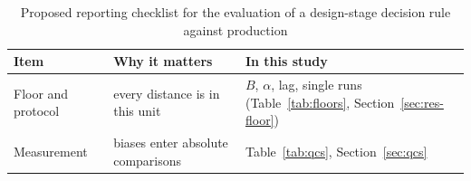 \documentclass[pdflatex,sn-basic,lineno]{sn-jnl}
\newcommand{\tabsize}{\fontsize{8}{9.5}\selectfont}
\providecommand{\DIFaddbeginFL}{} %
\providecommand{\DIFdelbeginFL}{} %
\providecommand{\DIFdelendFL}{} %
\newcommand{\DIFscaledelfig}{0.5}
\newlength{\DIFdelgraphicswidth} %
\newlength{\DIFdelgraphicsheight} %
\newcommand{\DIFaddincludegraphics}[2][]{{\color{blue}\fbox{\DIFOincludegraphics[#1]{#2}}}} %
\newcommand{\DIFdelincludegraphics}[2][]{%
\sbox{\DIFdelgraphicsbox}{\DIFOincludegraphics[#1]{#2}}%
\settoboxwidth{\DIFdelgraphicswidth}{\DIFdelgraphicsbox} %
\settoboxtotalheight{\DIFdelgraphicsheight}{\DIFdelgraphicsbox} %
\scalebox{\DIFscaledelfig}{%
\parbox[b]{\DIFdelgraphicswidth}{\usebox{\DIFdelgraphicsbox}\\[-\baselineskip] \rule{\DIFdelgraphicswidth}{0em}}\llap{\resizebox{\DIFdelgraphicswidth}{\DIFdelgraphicsheight}{%
\setlength{\unitlength}{\DIFdelgraphicswidth}%
\begin{picture}(1,1)%
\thicklines\linethickness{2pt} %
{\color[rgb]{1,0,0}\put(0,0){\framebox(1,1){}}}%
{\color[rgb]{1,0,0}\put(0,0){\line( 1,1){1}}}%
{\color[rgb]{1,0,0}\put(0,1){\line(1,-1){1}}}%
\end{picture}%
}\hspace*{3pt}}} %
} %
\DeclareRobustCommand{\DIFaddbeginFL}{\DIFOaddbeginFL \let\includegraphics\DIFaddincludegraphics} %
\DeclareRobustCommand{\DIFdelbeginFL}{\DIFOdelbeginFL \let\includegraphics\DIFdelincludegraphics} %
\DeclareRobustCommand{\DIFdelendFL}{\DIFOaddendFL \let\includegraphics\DIFOincludegraphics} %
\begin{document}
\begin{table}[t]
\tabsize
\setlength{\tabcolsep}{3pt}
\caption{Proposed reporting checklist for the evaluation of a design-stage decision rule against production}\label{tab:checklist}
\DIFdelbeginFL %
\DIFdelendFL \DIFaddbeginFL \begin{tabular}{@{}L{2.7cm}L{4.7cm}L{5.0cm}@{}}
\toprule
Item & Why it matters & In this study \\
\midrule
Floor and protocol & every distance is in this unit & $B$, $\alpha$, lag, single runs (Table~\ref{tab:floors}, Section~\ref{sec:res-floor}) \\
Measurement & biases enter absolute comparisons & Table~\ref{tab:qcs}, Section~\ref{sec:qcs} \\

\end{tabular}
\end{table}
\end{document}
